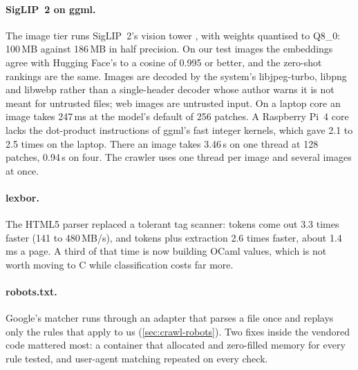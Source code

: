 \paragraph{SigLIP~2 on ggml.} The image tier runs SigLIP~2's vision tower \citep{tschannen2025siglip}, with weights quantised to Q8\_0: 100\,MB against 186\,MB in half precision. On our test images the embeddings agree with Hugging Face's to a cosine of 0.995 or better, and the zero-shot rankings are the same. Images are decoded by the system's libjpeg-turbo, libpng and libwebp rather than a single-header decoder whose author warns it is not meant for untrusted files; web images are untrusted input. On a laptop core an image takes 247\,ms at the model's default of 256 patches. A Raspberry Pi~4 core lacks the dot-product instructions of ggml's fast integer kernels, which gave 2.1 to 2.5 times on the laptop. There an image takes 3.46\,s on one thread at 128 patches, 0.94\,s on four. The crawler uses one thread per image and several images at once.

\paragraph{lexbor.} The HTML5 parser replaced a tolerant tag scanner: tokens come out 3.3 times faster (141 to 480\,MB/s), and tokens plus extraction 2.6 times faster, about 1.4\,ms a page. A third of that time is now building OCaml values, which is not worth moving to C while classification costs far more.

\paragraph{robots.txt.} Google's matcher runs through an adapter that parses a file once and replays only the rules that apply to us (\cref{sec:crawl-robots}). Two fixes inside the vendored code mattered most: a container that allocated and zero-filled memory for every rule tested, and user-agent matching repeated on every check.

